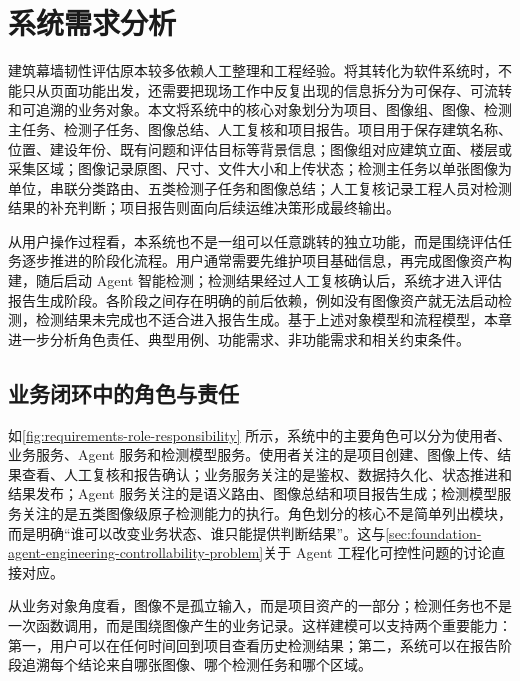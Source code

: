 \chapter{系统需求分析}
\label{chap:requirements}

建筑幕墙韧性评估原本较多依赖人工整理和工程经验。将其转化为软件系统时，不能只从页面功能出发，还需要把现场工作中反复出现的信息拆分为可保存、可流转和可追溯的业务对象。本文将系统中的核心对象划分为项目、图像组、图像、检测主任务、检测子任务、图像总结、人工复核和项目报告。项目用于保存建筑名称、位置、建设年份、既有问题和评估目标等背景信息；图像组对应建筑立面、楼层或采集区域；图像记录原图、尺寸、文件大小和上传状态；检测主任务以单张图像为单位，串联分类路由、五类检测子任务和图像总结；人工复核记录工程人员对检测结果的补充判断；项目报告则面向后续运维决策形成最终输出。

从用户操作过程看，本系统也不是一组可以任意跳转的独立功能，而是围绕评估任务逐步推进的阶段化流程。用户通常需要先维护项目基础信息，再完成图像资产构建，随后启动 Agent 智能检测；检测结果经过人工复核确认后，系统才进入评估报告生成阶段。各阶段之间存在明确的前后依赖，例如没有图像资产就无法启动检测，检测结果未完成也不适合进入报告生成。基于上述对象模型和流程模型，本章进一步分析角色责任、典型用例、功能需求、非功能需求和相关约束条件。

\section{业务闭环中的角色与责任}
\label{sec:requirements-role-and-responsibility-in-business-closed-loop}

如\cref{fig:requirements-role-responsibility} 所示，系统中的主要角色可以分为使用者、业务服务、Agent 服务和检测模型服务。使用者关注的是项目创建、图像上传、结果查看、人工复核和报告确认；业务服务关注的是鉴权、数据持久化、状态推进和结果发布；Agent 服务关注的是语义路由、图像总结和项目报告生成；检测模型服务关注的是五类图像级原子检测能力的执行。角色划分的核心不是简单列出模块，而是明确“谁可以改变业务状态、谁只能提供判断结果”。这与\cref{sec:foundation-agent-engineering-controllability-problem}关于 Agent 工程化可控性问题的讨论直接对应。

从业务对象角度看，图像不是孤立输入，而是项目资产的一部分；检测任务也不是一次函数调用，而是围绕图像产生的业务记录。这样建模可以支持两个重要能力：第一，用户可以在任何时间回到项目查看历史检测结果；第二，系统可以在报告阶段追溯每个结论来自哪张图像、哪个检测任务和哪个区域。

